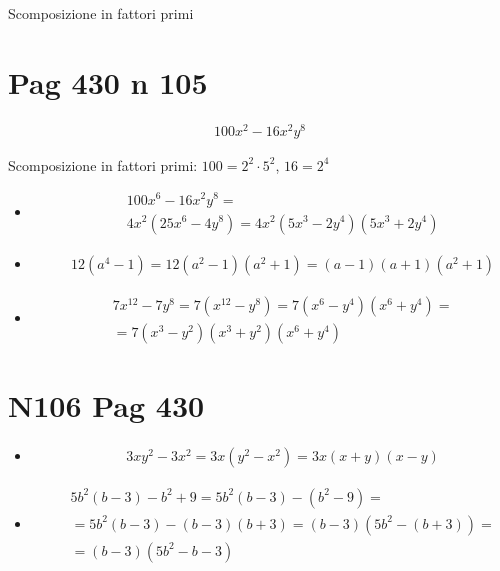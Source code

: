 \documentclass[17pt]{extarticle}
\begin{document}
Scomposizione in fattori primi

\section{Pag 430 n 105}
\begin{eqnarray}
	100x^2 -16x^2y^8
\end{eqnarray}

Scomposizione in fattori primi: $100 = 2^2\cdot5^2$, $16 = 2^4$
\begin{itemize}
\item
\begin{eqnarray}
	& & 100x^6 -16x^2y^8 = \\
	& & 4x^2\left(25x^6 -4y^8\right) = 4x^2\left( 5x^3 - 2y^4\right)\left( 5x^3 + 2y^4\right) 
\end{eqnarray}

\item
\begin{eqnarray}\nonumber
	& & 12(a^4-1) = 12(a^2-1)(a^2+1)=(a-1)(a+1)(a^2+1) 
\end{eqnarray}

\item 
\begin{eqnarray}
	& & 7x^{12}-7y^8 = 7(x^{12}-y^8) = 7(x^6-y^4)(x^6+y^4) = \\
	& & =7(x^3-y^2)(x^3+y^2)(x^6+y^4) 
\end{eqnarray}

\end{itemize}


\section{N106 Pag 430}

\begin{itemize}
\item
\begin{eqnarray}
	& & 3xy^2 - 3x^2 = 3x(y^2-x^2) = 3x(x +y)(x-y)
\end{eqnarray}

\item
\begin{eqnarray}
	& & 5b^2(b-3)-b^2+9 = 5b^2(b-3) -(b^2-9) = \\
	& & = 5b^2(b-3) - (b-3)(b+3) = (b-3)(5b^2-(b+3)) =\\
	& & = (b-3)(5b^2-b-3)
\end{eqnarray}

\end{itemize}
\end{document}
